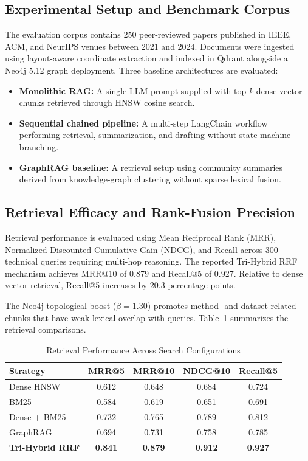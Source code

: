 \documentclass[conference]{IEEEtran}
\begin{document}
\subsection{Experimental Setup and Benchmark Corpus}
The evaluation corpus contains 250 peer-reviewed papers published in IEEE, ACM, and NeurIPS venues between 2021 and 2024. Documents were ingested using layout-aware coordinate extraction and indexed in Qdrant alongside a Neo4j 5.12 graph deployment. Three baseline architectures are evaluated:
\begin{itemize}
\item \textbf{Monolithic RAG:} A single LLM prompt supplied with top-$k$ dense-vector chunks retrieved through HNSW cosine search.
\item \textbf{Sequential chained pipeline:} A multi-step LangChain workflow performing retrieval, summarization, and drafting without state-machine branching.
\item \textbf{GraphRAG baseline:} A retrieval setup using community summaries derived from knowledge-graph clustering without sparse lexical fusion.
\end{itemize}

\subsection{Retrieval Efficacy and Rank-Fusion Precision}
Retrieval performance is evaluated using Mean Reciprocal Rank (MRR), Normalized Discounted Cumulative Gain (NDCG), and Recall across 300 technical queries requiring multi-hop reasoning. The reported Tri-Hybrid RRF mechanism achieves MRR@10 of 0.879 and Recall@5 of 0.927. Relative to dense vector retrieval, Recall@5 increases by 20.3 percentage points.

 The Neo4j topological boost ($\beta = 1.30$) promotes method- and dataset-related chunks that have weak lexical overlap with queries. Table~\ref{tab:retrieval} summarizes the retrieval comparisons.

\begin{table}[!t]
\caption{Retrieval Performance Across Search Configurations}
\label{tab:retrieval}
\centering
\footnotesize
\setlength{\tabcolsep}{3.5pt}
\begin{tabular}{@{}lcccc@{}}
\toprule
\textbf{Strategy} & \textbf{MRR@5} & \textbf{MRR@10} & \textbf{NDCG@10} & \textbf{Recall@5} \\
\midrule
Dense HNSW & 0.612 & 0.648 & 0.684 & 0.724 \\
BM25 & 0.584 & 0.619 & 0.651 & 0.691 \\
Dense + BM25 & 0.732 & 0.765 & 0.789 & 0.812 \\
GraphRAG & 0.694 & 0.731 & 0.758 & 0.785 \\
\textbf{Tri-Hybrid RRF} & \textbf{0.841} & \textbf{0.879} & \textbf{0.912} & \textbf{0.927} \\
\bottomrule
\end{tabular}
\end{table}
\end{document}
